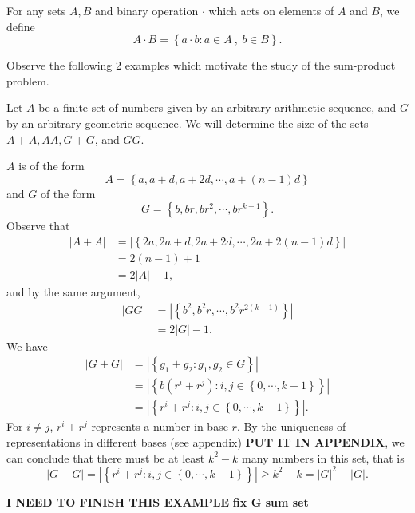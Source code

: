 \documentclass[12pt]{amsart}
\begin{document}
For any sets \(A,B\) and binary operation \(\cdot \) which acts on elements of \(A\) and \(B\), we define
\[
    A \cdot  B = \left\{ a \cdot  b : a \in A~,~ b \in B \right\} 
.\]

Observe the following 2 examples which motivate the study of the sum-product problem.

Let \(A\) be a finite set of numbers given by an arbitrary arithmetic sequence, and \(G\)
by an arbitrary geometric sequence. We will determine the size of the sets \(A + A, AA , G + G\), and \(GG\). 

\(A\) is of the form
\[
    A = \left\{ a , a + d , a+2d , \cdots , a + (n-1)d \right\} 
\]
and \(G\) of the form
\[
    G = \left\{ b, br , br^{2}, \cdots , br^{k - 1} \right\} 
.\]
Observe that
\begin{align*}
    \left\lvert A + A \right\rvert  & = \left\lvert \left\{ 2a, 2a + d, 2a + 2d ,\cdots , 2a + 2(n-1)d \right\}  \right\rvert \\
    & = 2(n-1) + 1 \\
    & = 2 \left\lvert A \right\rvert - 1,
\end{align*}
and by the same argument,
\begin{align*}
    \left\lvert GG \right\rvert  & = \left\lvert \left\{ b^{2} , b^{2}r , \cdots , b^{2}r^{2(k-1)} \right\} \right\rvert  \\
    & =2 \left\lvert G \right\rvert -1.
\end{align*}
We have
\begin{align*}
    \left\lvert G + G \right\rvert & = \left\lvert \left\{ g_1 + g_2 : g_1,g_2 \in G \right\} \right\rvert  \\
    & = \left\lvert \left\{ b(r^{i} + r^{j}): i,j \in \left\{ 0, \cdots , k-1 \right\}  \right\} \right\rvert \\
    & = \left\lvert \left\{r^{i} + r^{j}: i,j \in \left\{ 0, \cdots , k-1 \right\}  \right\} \right\rvert.
\end{align*}
For \(i \neq j\), \(r^{i} + r^{j}\) represents a number in base \(r\). By the uniqueness of representations
in different bases (see appendix) \textbf{PUT IT IN APPENDIX}, we can conclude that there must be at least \(k^{2}- k\) many numbers in this set, that is
\[
    \left\lvert G + G \right\rvert = \left\lvert \left\{ r^{i} + r^{j} : i,j \in \left\{ 0 , \cdots , k-1 \right\}   \right\}  \right\rvert \geq k^{2}- k = \left\lvert G \right\rvert ^{2} - \left\lvert G \right\rvert 
.\]

\textbf{I NEED TO FINISH THIS EXAMPLE}
\textbf{fix G sum set}
\end{document}
